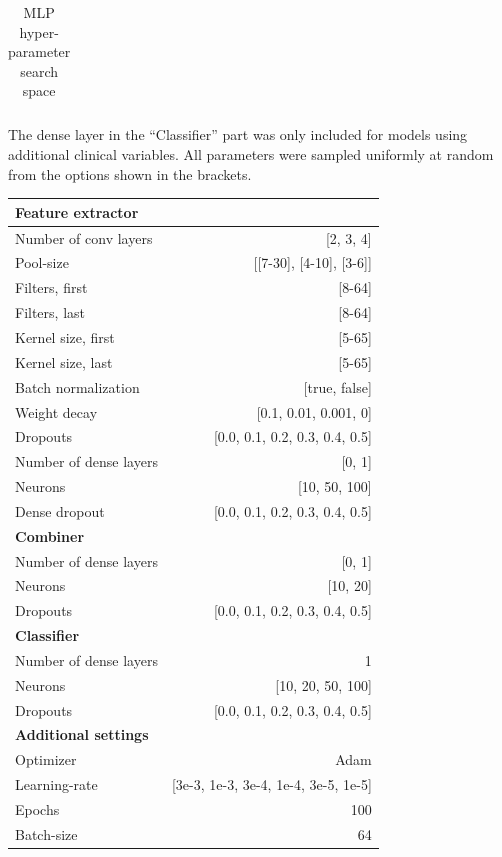 \documentclass[preprint]{elsarticle}
\begin{document}
\begin{table}[H]
\begin{adjustbox}{center}
\begin{tabular}{@{}lr@{}}
\bottomrule
\end{tabular}
\end{adjustbox}
\caption{MLP hyper-parameter search space}
\medskip
\small
The dense layer in the ``Classifier'' part was only included for models using additional clinical variables. All parameters were sampled uniformly at random from the options shown in the brackets.
\label{table:mlp}
\end{table}
\renewcommand{\arraystretch}{1}


\renewcommand{\arraystretch}{1.2}
\begin{table}[H]
  \centering
  \scriptsize
\begin{adjustbox}{center}
\begin{tabular}{@{}lr@{}}
\textbf{Feature extractor}  & \\
\midrule
{Number of conv layers}     & [2, 3, 4] \\
{Pool-size}                 & [[7-30], [4-10], [3-6]] \\
{Filters, first}            & [8-64] \\
{Filters, last}             & [8-64] \\
{Kernel size, first}        & [5-65] \\
{Kernel size, last}         & [5-65] \\
{Batch normalization}       & [true, false] \\
{Weight decay}              & [0.1, 0.01, 0.001, 0] \\
{Dropouts}                  & [0.0, 0.1, 0.2, 0.3, 0.4, 0.5] \\
{Number of dense layers}    & [0, 1] \\
{Neurons}                   & [10, 50, 100] \\
{Dense dropout}             & [0.0, 0.1, 0.2, 0.3, 0.4, 0.5] \\
\midrule
\textbf{Combiner}           & \\
\midrule
{Number of dense layers}    & [0, 1] \\
{Neurons}                   & [10, 20] \\
{Dropouts}                  & [0.0, 0.1, 0.2, 0.3, 0.4, 0.5] \\
\midrule
\textbf{Classifier}         & \\
\midrule
{Number of dense layers}    & 1 \\
{Neurons}                   & [10, 20, 50, 100] \\
{Dropouts}                  & [0.0, 0.1, 0.2, 0.3, 0.4, 0.5] \\
\midrule
\textbf{Additional settings} & \\
\midrule
Optimizer                   & Adam \\
Learning-rate               & [3e-3, 1e-3, 3e-4, 1e-4, 3e-5, 1e-5] \\
Epochs                      & 100 \\
Batch-size                  & 64 \\


\end{tabular}
\end{adjustbox}
\end{table}
\end{document}
